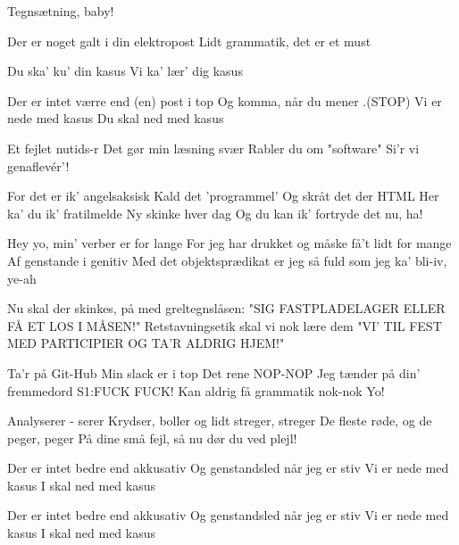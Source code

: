 \documentclass[a4paper,11pt]{article}
\begin{document}
\begin{song}
Tegnsætning, baby!

Der er noget galt i din elektropost
Lidt grammatik, det er et must

 Du ska' ku' din kasus
 Vi ka' lær' dig kasus

 Der er intet værre end (en) post i top
 Og komma, når du mener .(STOP)
 Vi er nede med kasus
 Du skal ned med kasus

 Et fejlet nutids-r
 Det gør min læsning svær
 Rabler du om "software"
 Si'r vi genaflevér'!

 For det er ik' angelsaksisk
 Kald det 'programmel'
 Og skråt det der HTML
 Her ka' du ik' fratilmelde
 Ny skinke hver dag
 Og du kan ik' fortryde det nu,  ha!


Hey yo, min' verber er for lange
For jeg har drukket og måske få't lidt for mange
 Af genstande i genitiv
 Med det objektsprædikat er jeg så fuld som jeg ka' bli-iv, ye-ah


Nu skal der skinkes, på med greltegnslåsen:
"SIG FASTPLADELAGER ELLER FÅ ET LOS I MÅSEN!"
 Retstavningsetik skal vi nok lære dem
 "VI' TIL FEST MED PARTICIPIER OG TA'R ALDRIG HJEM!"

Ta'r på Git-Hub
Min slack er i top
Det rene NOP-NOP
 Jeg tænder på din' fremmedord S1:FUCK FUCK!
 Kan aldrig få grammatik nok-nok
 Yo!

Analyserer - serer
Krydser, boller og lidt streger, streger
De fleste røde, og de peger, peger
På dine små fejl, så nu dør du ved plejl!

 Der er intet bedre end akkusativ
 Og genstandsled når jeg er stiv
 Vi er nede med kasus
 I skal ned med kasus 

 Der er intet bedre end akkusativ
 Og genstandsled når jeg er stiv
 Vi er nede med kasus
 I skal ned med kasus 


\end{song}
\end{document}

